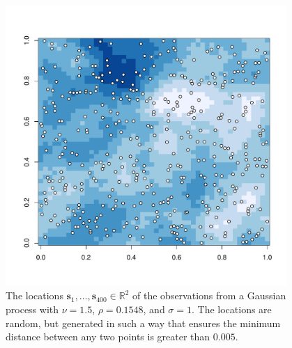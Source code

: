 \documentclass[12pt]{article}
\begin{document}
\begin{figure}[!htb]
  \centering
  \includegraphics[width=0.95\textwidth]{locations.pdf}
  \caption{\small The locations $\bm{s}_1, \dots, \bm{s}_{400} \in \mathbb{R}^2$ of the observations from a Gaussian process with $\nu = 1.5$, $\rho = 0.1548$, and $\sigma = 1$. The locations are random, but generated in such a way that ensures the minimum distance between any two points is greater than $0.005$.}
  \label{fig:locations}
\end{figure}
\end{document}
